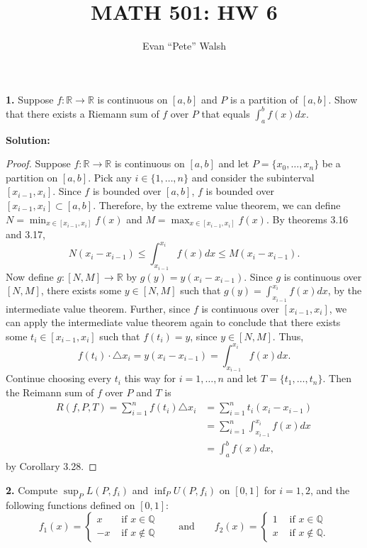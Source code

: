 \documentclass[12pt]{article}
\title{MATH 501: HW 6}
\author{Evan ``Pete'' Walsh}
\begin{document}
\maketitle

{\bf 1.} Suppose $f:\mathbb{R} \rightarrow \mathbb{R}$ is continuous on $[a,b]$
and $P$ is a partition of $[a,b]$. Show that there exists a Riemann sum of $f$
over $P$ that equals $\int_{a}^{b}f(x)dx$.

{\bf Solution:}

\begin{proof}
  Suppose $f:\mathbb{R} \rightarrow \mathbb{R}$ is continuous on $[a,b]$ and let
  $P = \{x_{0}, \dots, x_{n}\}$ be a partition on $[a,b]$. Pick any $i\in
  \{1,\dots, n\}$ and consider the subinterval $[x_{i-1}, x_{i}]$. Since $f$ is
  bounded over $[a,b]$, $f$ is bounded over $[x_{i-1},x_{i}] \subset [a,b]$.
  Therefore, by the extreme value theorem, we can define $N = \min_{x\in
    [x_{i-1},x_{i}]}f(x)$ and $M = \max_{x\in [x_{i-1},x_{i}]}f(x)$. By theorems
  3.16 and 3.17, 
  \[ N(x_{i} - x_{i-1}) \leq \int_{x_{i-1}}^{x_{i}}f(x)dx \leq M(x_{i}-x_{i-1}).
  \]
  Now define $g : [N,M] \rightarrow \mathbb{R}$ by $g(y) = y(x_{i} - x_{i-1})$.
  Since $g$ is continuous over $[N,M]$, there exists some $y\in [N,M]$ such that
  $g(y) = \int_{x_{i-1}}^{x_{i}}f(x)dx$, by the intermediate value theorem.
  Further, since $f$ is continuous over $[x_{i-1}, x_{i}]$, we can apply the
  intermediate value theorem again to conclude that there exists some $t_{i}\in
  [x_{i-1},x_{i}]$ such that $f(t_{i}) = y$, since $y \in [N, M]$. Thus,
  \[ f(t_{i})\cdot \triangle x_{i} = y(x_{i}-x_{i-1}) =
  \int_{x_{i-1}}^{x_{i}}f(x)dx. \]
  Continue choosing every $t_{i}$ this way for $i = 1,\dots, n$ and let $T =
  \{t_{1},\dots, t_{n}\}$. Then the Reimann sum of $f$ over $P$ and $T$ is 
  \begin{align*}
    R(f,P,T) = \sum_{i=1}^{n}f(t_{i})\triangle x_{i} & =
    \sum_{i=1}^{n}t_{i}(x_{i} - x_{i-1}) \\
    & = \sum_{i=1}^{n}\int_{x_{i-1}}^{x_{i}} f(x) dx \\
    & = \int_{a}^{b}f(x)dx,
  \end{align*}
  by Corollary 3.28.
\end{proof}

{\bf 2.} Compute $\sup_{P}L(P, f_{i})$ and $\inf_{P}U(P,f_{i})$ on $[0,1]$ for
$i = 1,2$, and the following functions defined on $[0,1]$:
\[ f_{1}(x) = \left\{\begin{array}{cl}
    x & \text{ if } x \in \mathbb{Q} \\
    -x & \text{ if } x \notin \mathbb{Q} 
  \end{array} \right. \qquad \text{and} \qquad f_{2}(x) = \left\{
    \begin{array}{cl}
      1 & \text{ if }x \in \mathbb{Q} \\
      x & \text{ if }x \notin \mathbb{Q}.
  \end{array} \right. \]
\end{document}

